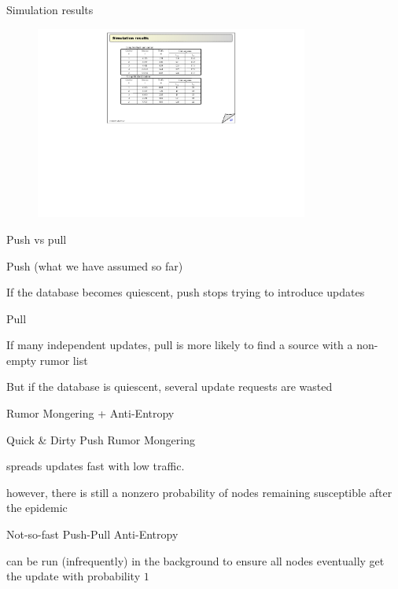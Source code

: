 \begin{frame}{Simulation results}
	
\begin{figure}
	\includegraphics[width=0.8\textwidth]{simulation}	
\end{figure}

\end{frame}

\begin{frame}{Push vs pull}
	
\BIL
\item Push (what we have assumed so far)
\BI
\item If the database becomes quiescent, push stops trying to introduce updates
\EI
\item Pull
\BI
\item If many independent updates, pull is more likely to find a source with a non-empty rumor list
\item But if the database is quiescent, several update requests are wasted
\EI
\EIL

\end{frame}

\begin{frame}{Rumor Mongering + Anti-Entropy}

\BIL
\item Quick \& Dirty Push Rumor Mongering 
\BI
\item spreads updates fast with low traffic.
\item however, there is still a nonzero probability of nodes remaining susceptible after the epidemic
\EI
\item Not-so-fast Push-Pull Anti-Entropy
\BI
\item can be run (infrequently) in the background to ensure all nodes eventually get the update with probability $1$
\EI
\EIL

\end{frame}

